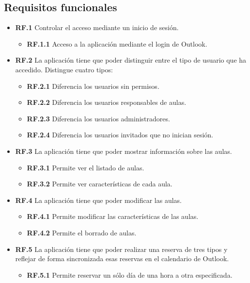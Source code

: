 \subsection{Requisitos funcionales} 
\begin{itemize}
    \item \textbf{RF.1} Controlar el acceso mediante un inicio de sesión.
    \begin{itemize}
        \item \textbf{RF.1.1} Acceso a la aplicación mediante el login de Outlook.
    \end{itemize}
    \item \textbf{RF.2} La aplicación tiene que poder distinguir entre el tipo de usuario que ha accedido. Distingue cuatro tipos:
    \begin{itemize}
        \item \textbf{RF.2.1} Diferencia los usuarios sin permisos.
        \item \textbf{RF.2.2} Diferencia los usuarios responsables de aulas.
        \item \textbf{RF.2.3} Diferencia los usuarios administradores.
        \item \textbf{RF.2.4} Diferencia los usuarios invitados que no inician sesión.
    \end{itemize}
    \item \textbf{RF.3} La aplicación tiene que poder mostrar información sobre las aulas.
    \begin{itemize}
        \item \textbf{RF.3.1} Permite ver el listado de aulas.
        \item \textbf{RF.3.2} Permite ver características de cada aula.
    \end{itemize}
    \item \textbf{RF.4} La aplicación tiene que poder modificar las aulas.
    \begin{itemize}
        \item \textbf{RF.4.1} Permite modificar las características de las aulas.
        \item \textbf{RF.4.2} Permite el borrado de aulas.
    \end{itemize}
    \item \textbf{RF.5} La aplicación tiene que poder realizar una reserva de tres tipos y reflejar de forma sincronizada esas reservas en el calendario de Outlook.
    \begin{itemize}
        \item \textbf{RF.5.1} Permite reservar un sólo día de una hora a otra especificada.

\end{itemize}
\end{itemize}
